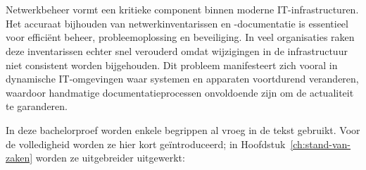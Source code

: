 
\chapter{}%
\label{ch:inleiding}

Netwerkbeheer vormt een kritieke component binnen moderne IT-infrastructuren. Het accuraat bijhouden van netwerkinventarissen en -documentatie is essentieel voor efficiënt beheer, probleemoplossing en beveiliging. In veel organisaties raken deze inventarissen echter snel verouderd omdat wijzigingen in de infrastructuur niet consistent worden bijgehouden. Dit probleem manifesteert zich vooral in dynamische IT-omgevingen waar systemen en apparaten voortdurend veranderen, waardoor handmatige documentatieprocessen onvoldoende zijn om de actualiteit te garanderen\autocite{NetBoxPlanning}.

In deze bachelorproef worden enkele begrippen al vroeg in de tekst gebruikt. Voor de volledigheid worden ze hier kort geïntroduceerd; in Hoofdstuk~\ref{ch:stand-van-zaken} worden ze uitgebreider uitgewerkt:


